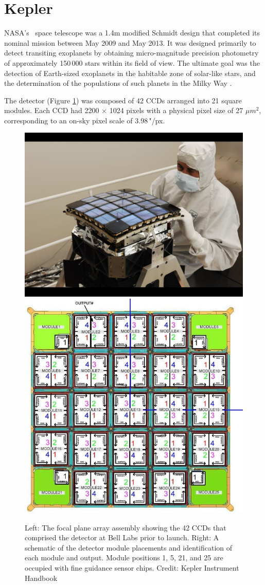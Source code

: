 \section{Kepler}
NASA's \Kepler~space telescope was a 1.4m modified Schmidt design that completed its nominal mission between May 2009 and May 2013. It was designed primarily to detect transiting exoplanets by obtaining micro-magnitude precision photometry of approximately 150\,000 stars within its field of view. The ultimate goal was the detection of Earth-sized exoplanets in the habitable zone of solar-like stars, and the determination of the populations of such planets in the Milky Way \citep{koch_kepler_2010}.

The detector (Figure \ref{fig:Kep_detect}) was composed of 42 CCDs arranged into 21 square modules. Each CCD had 2200 $\times$ 1024 pixels with a physical pixel size of 27 $\mu m^2$, corresponding to an on-sky pixel scale of 3.98\,"/px. %

\begin{figure}[htbp]
    \centering
    \includegraphics[width=0.45\linewidth]{Chapter1/Kepler_detector.jpg}
    \includegraphics[width=0.45\linewidth]{Chapter1/kepCCD.jpg}
    \caption[Kepler CCD detector array prior to installation]{Left: The focal plane array assembly showing the 42 CCDs that comprised the detector at Bell Labs prior to launch. Right: A schematic of the detector module placements and identification of each module and output. Module positions 1, 5, 21, and 25 are occupied with fine guidance sensor chips. Credit: Kepler Instrument Handbook}
    \label{fig:Kep_detect}
\end{figure}

